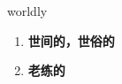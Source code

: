 
\begin{frame}
{\huge worldly}
\begin{center}
\begin{enumerate}\Large
  \item \textbf{世间的，世俗的}
  \item \textbf{老练的}
\end{enumerate}
\end{center}
\end{frame}
